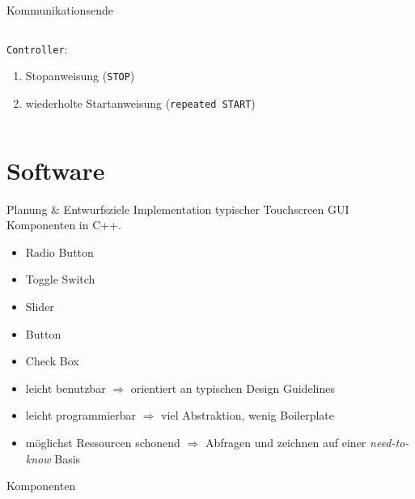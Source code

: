 \documentclass[12pt]{beamer}
\begin{document}
	\begin{frame}{Kommunikationsende}
		\begin{columns}
			\begin{column}{0.55\textwidth}
				\texttt{Controller}:
				\begin{enumerate}[a]
					\item Stopanweisung (\texttt{STOP})
					\item wiederholte Startanweisung (\texttt{repeated START})
				\end{enumerate}
			\end{column}
			\begin{column}{0.4\textwidth}
				
				
			\end{column}
		\end{columns}
	\end{frame}
	
	\section{Software}
	\frame{\tableofcontents[currentsection]}
	
	\begin{frame}{Planung \& Entwurfsziele}
		Implementation typischer Touchscreen GUI Komponenten in C++.
		
		\begin{itemize}
			\item Radio Button
			\item Toggle Switch
			\item Slider
			\item Button
			\item Check Box
		\end{itemize}
		\pause
		\bigskip
		\begin{itemize}
			\item leicht benutzbar $\Rightarrow$ orientiert an typischen Design Guidelines \cite{material-components} \pause
			\item leicht programmierbar $\Rightarrow$ viel Abstraktion, wenig Boilerplate \pause
			\item möglichst Ressourcen schonend $\Rightarrow$ Abfragen und zeichnen auf einer \emph{need-to-know} Basis
		\end{itemize}
	\end{frame}

	\begin{frame}{Komponenten}
		\centering
	\end{frame}
\end{document}
